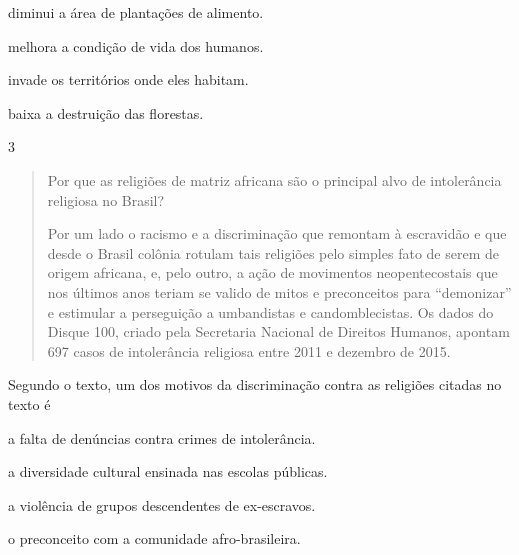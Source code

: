 \begin{escolha}
\item diminui a área de plantações de alimento.

\item melhora a condição de vida dos humanos.

\item invade os territórios onde eles habitam.

\item baixa a destruição das florestas.
\end{escolha}


\num{3}

\begin{quote}
Por que as religiões de matriz africana são o principal alvo de
intolerância religiosa no Brasil?

Por um lado o racismo e a discriminação que remontam à escravidão e que
desde o Brasil colônia rotulam tais religiões pelo simples fato de serem
de origem africana, e, pelo outro, a ação de movimentos neopentecostais
que nos últimos anos teriam se valido de mitos e preconceitos para
``demonizar'' e estimular a perseguição a umbandistas e candomblecistas.
Os dados do Disque 100, criado pela Secretaria Nacional de Direitos
Humanos, apontam 697 casos de intolerância religiosa entre 2011 e
dezembro de 2015.
\end{quote}

Segundo o texto, um dos motivos da discriminação contra as religiões
citadas no texto é

\begin{escolha}
\item a falta de denúncias contra crimes de intolerância.

\item a diversidade cultural ensinada nas escolas públicas.

\item a violência de grupos descendentes de ex-escravos.

\item o preconceito com a comunidade afro-brasileira.
\end{escolha}

